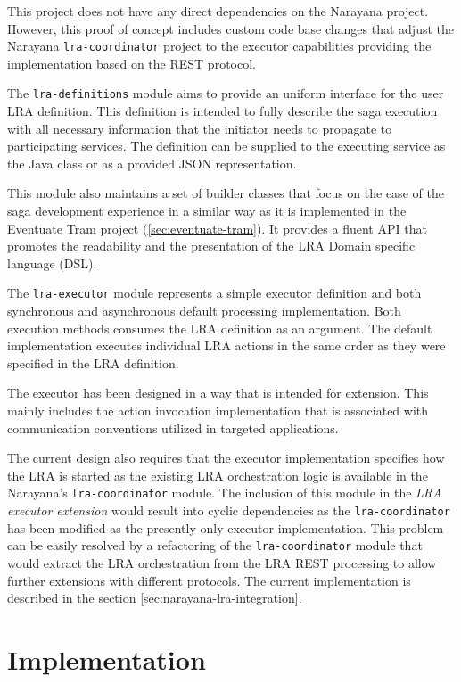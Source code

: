 \documentclass[oneside,
  digital, %
  table,   %
  nolof,     %
  nolot,     %
]{fithesis3}
\begin{document}
This project does not have any direct dependencies on the Narayana project. However, this proof of concept includes custom code base changes that adjust the Narayana \texttt{lra-coordinator} project to the executor capabilities providing the implementation based on the REST protocol.

The \texttt{lra-definitions} module aims to provide an uniform interface for the user LRA definition. This definition is intended to fully describe the saga execution with all necessary information that the initiator needs to propagate to participating services. The definition can be supplied to the executing service as the Java class or as a provided JSON representation.

This module also maintains a set of builder classes that focus on the ease of the saga development experience in a similar way as it is implemented in the Eventuate Tram project (\ref{sec:eventuate-tram}). It provides a fluent API that promotes the readability and the presentation of the LRA Domain specific language (DSL).  

The \texttt{lra-executor} module represents a simple executor definition and both synchronous and asynchronous default processing implementation. Both execution methods consumes the LRA definition as an argument. The default implementation executes individual LRA actions in the same order as they were specified in the LRA definition.

The executor has been designed in a way that is intended for extension. This mainly includes the action invocation implementation that is associated with communication conventions utilized in targeted applications. 

The current design also requires that the executor implementation specifies how the LRA is started as the existing LRA orchestration logic is available in the Narayana's \texttt{lra-coordinator} module. The inclusion of this module in the \textit{LRA executor extension} would result into cyclic dependencies as the \texttt{lra-coordinator} has been modified as the presently only executor implementation. This problem can be easily resolved by a refactoring of the \texttt{lra-coordinator} module that would extract the LRA orchestration from the LRA REST processing to allow further extensions with different protocols. The current implementation is described in the section \ref{sec:narayana-lra-integration}.


\section{Implementation}
\end{document}
